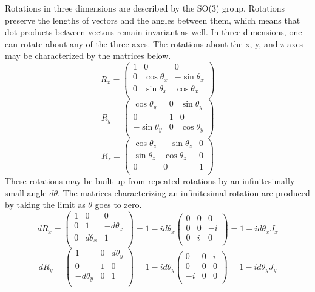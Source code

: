 Rotations in three dimensions are described by the SO(3) group. Rotations preserve the lengths of vectors and the angles between them, which means that dot products between vectors remain invariant as well. In three dimensions, one can rotate about any of the three axes. The rotations about the x, y, and z axes may be characterized by the matrices below.
\begin{equation}
R_x = 
\begin{pmatrix}
1 & 0 & 0 \\
0 & \cos\theta_x & -\sin\theta_x \\
0 & \sin\theta_x & \cos\theta_x \\
\end{pmatrix}
\end{equation}
\begin{equation}
R_y = 
\begin{pmatrix}
\cos\theta_y & 0 & \sin\theta_y \\
0 & 1 & 0 \\
-\sin\theta_y & 0 & \cos\theta_y \\
\end{pmatrix}
\end{equation}
\begin{equation}
R_z = 
\begin{pmatrix}
\cos\theta_z & -\sin\theta_z & 0 \\
\sin\theta_z & \cos\theta_z & 0 \\
0 & 0 & 1 \\
\end{pmatrix}
\end{equation}
These rotations may be built up from repeated rotations by an infinitesimally small angle $d\theta$. The matrices characterizing an infinitesimal rotation are produced by taking the limit as $\theta$ goes to zero.
\begin{equation}
dR_x = 
\begin{pmatrix}
1 & 0 & 0 \\
0 & 1 & -d\theta_x \\
0 & d\theta_x & 1 \\
\end{pmatrix}
= 1 - id\theta_x
\begin{pmatrix}
0 & 0 & 0 \\
0 & 0 & -i \\
0 & i & 0 \\
\end{pmatrix}
= 1 - id\theta_x J_x
\end{equation}
\begin{equation}
dR_y = 
\begin{pmatrix}
1 & 0 & d\theta_y \\
0 & 1 & 0 \\
-d\theta_y & 0 & 1 \\
\end{pmatrix}
= 1 - id\theta_y
\begin{pmatrix}
0 & 0 & i \\
0 & 0 & 0 \\
-i & 0 & 0 \\
\end{pmatrix}
= 1 - id\theta_y J_y
\end{equation}
